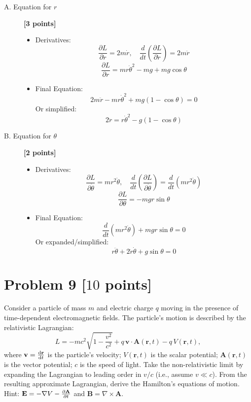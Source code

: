 \documentclass[11pt, a4paper]{article} %
\begin{document}
\begin{description}
    \item[A. Equation for $r$] \hfill \textbf{[3 points]}
    \begin{itemize}
        \item Derivatives:
        $$ \frac{\partial L}{\partial \dot{r}} = 2m\dot{r}, \quad \frac{d}{dt}\left(\frac{\partial L}{\partial \dot{r}}\right) = 2m\ddot{r} $$
        $$ \frac{\partial L}{\partial r} = mr\dot{\theta}^2 - mg + mg\cos\theta $$
        \item Final Equation:
        $$ 2m\ddot{r} - mr\dot{\theta}^2 + mg(1 - \cos\theta) = 0 $$
        Or simplified:
        $$ \boxed{2\ddot{r} = r\dot{\theta}^2 - g(1 - \cos\theta)} $$
    \end{itemize}

    \item[B. Equation for $\theta$] \hfill \textbf{[2 points]}
    \begin{itemize}
        \item Derivatives:
        $$ \frac{\partial L}{\partial \dot{\theta}} = mr^2\dot{\theta}, \quad \frac{d}{dt}\left(\frac{\partial L}{\partial \dot{\theta}}\right) = \frac{d}{dt}(mr^2\dot{\theta}) $$
        $$ \frac{\partial L}{\partial \theta} = -mgr\sin\theta $$
        \item Final Equation:
        $$ \frac{d}{dt}(mr^2\dot{\theta}) + mgr\sin\theta = 0 $$
        Or expanded/simplified:
        $$ \boxed{r\ddot{\theta} + 2\dot{r}\dot{\theta} + g\sin\theta = 0} $$
    \end{itemize}
\end{description}

\newpage

\section*{Problem 9 [$10$ points]}
Consider a particle of mass $m$ and electric charge $q$ moving in the presence of time-dependent electromagnetic fields. The particle's motion is described by the relativistic Lagrangian:
\[
L = -mc^2\sqrt{1 - \frac{v^2}{c^2}} + q\, \mathbf{v} \cdot \mathbf{A}(\mathbf{r}, t) - q\, V(\mathbf{r}, t),
\]
where $\mathbf{v} = \dv{\mathbf{r}}{t}$ is the particle's velocity; $V(\mathbf{r}, t)$ is the scalar potential; $\mathbf{A}(\mathbf{r}, t)$ is the vector potential; $c$ is the speed of light. Take the non-relativistic limit by expanding the Lagrangian to leading order in $v/c$ (i.e., assume $v \ll c$). From the resulting approximate Lagrangian, derive the Hamilton's equations of motion.
Hint: $\mathbf{E} = -\nabla V - \pdv{\mathbf{A}}{t}$ and $\mathbf{B} = \nabla \times \mathbf{A}$.
\end{document}

